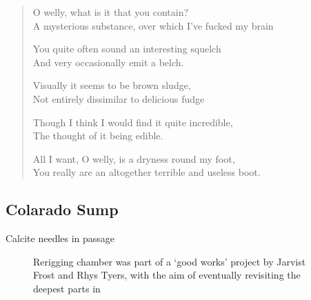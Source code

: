 \begin{verse}
\begin{centering}
 O welly, what is it that you contain?\\
A mysterious substance, over which I've fucked my brain

You quite often sound an interesting squelch\\
And very occasionally emit a belch.

Visually it seems to be brown sludge,\\
Not entirely dissimilar to delicious fudge

Though I think I would find it quite incredible,\\
The thought of it being edible.

All I want, O welly, is a dryness round my foot, \\
You really are an altogether terrible and useless boot.\\
 \end{centering} 
\end{verse}

\subsection{Colarado Sump}


       
\begin{marginfigure}
        \centering
        \caption{Calcite needles in \protect{} passage } \label{fig:leprechaun}
\end{marginfigure}

\begin{figure}[t]
	\checkoddpage \ifoddpage \forcerectofloat \else \forceversofloat \fi
    		\centering
    
   		\caption{Rerigging \protect{} chamber was part of a `good works' project by Jarvist Frost and Rhys Tyers, with the aim of eventually revisiting the deepest parts in \protect{}
    		 }
		 \label{scan}
\end{figure}
          
